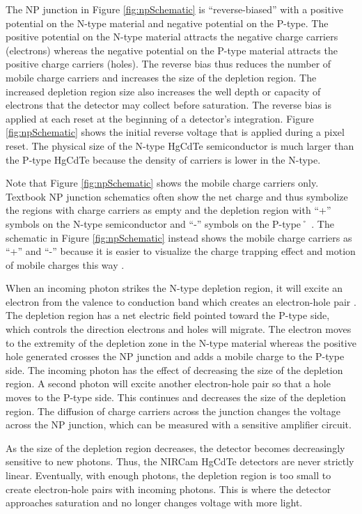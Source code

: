 \documentclass{aastex62}
\begin{document}
The NP junction in Figure \ref{fig:npSchematic} is ``reverse-biased'' with a positive potential on the N-type material and negative potential on the P-type.
The positive potential on the N-type material attracts the negative charge carriers (electrons) whereas the negative potential on the P-type material attracts the  positive charge carriers (holes).
The reverse bias thus reduces the number of mobile charge carriers and increases the size of the depletion region.
The increased depletion region size also increases the well depth or capacity of electrons that the detector may collect before saturation.
The reverse bias is applied at each reset at the beginning of a detector's integration.
Figure \ref{fig:npSchematic} shows the initial reverse voltage that is applied during a pixel reset. 
The physical size of the N-type HgCdTe semiconductor is much larger than the P-type HgCdTe because the density of carriers is lower in the N-type.

Note that Figure \ref{fig:npSchematic} shows the mobile charge carriers only.
Textbook NP junction schematics often show the net charge and thus symbolize the regions with charge carriers as empty and the depletion region with ``+'' symbols on the N-type semiconductor and ``-'' symbols on the P-type˚ \citep[e.g.][]{halliday2004physicsText}.
The schematic in Figure \ref{fig:npSchematic} instead shows the mobile charge carriers as ``+'' and ``-'' because it is easier to visualize the charge trapping effect and motion of mobile charges this way \citep[e.g.][]{smith2008imgPersistence}.

When an incoming photon strikes the N-type depletion region, it will excite an electron from the valence to conduction band which creates an electron-hole pair \citep{rieke2007irDetectorReview}.
The depletion region has a net electric field pointed toward the P-type side, which controls the direction electrons and holes will migrate.
The electron moves to the extremity of the depletion zone in the N-type material whereas the positive hole generated crosses the NP junction and adds a mobile charge to the P-type side.
The incoming photon has the effect of decreasing the size of the depletion region.
A second photon will excite another electron-hole pair so that a hole moves to the P-type side.
This continues and decreases the size of the depletion region.
The diffusion of charge carriers across the junction changes the voltage across the NP junction, which can be measured with a sensitive amplifier circuit.

As the size of the depletion region decreases, the detector becomes decreasingly sensitive to new photons.
Thus, the NIRCam HgCdTe detectors are never strictly linear.
Eventually, with enough photons, the depletion region is too small to create electron-hole pairs with incoming photons.
This is where the detector approaches saturation and no longer changes voltage with more light.
\end{document}
